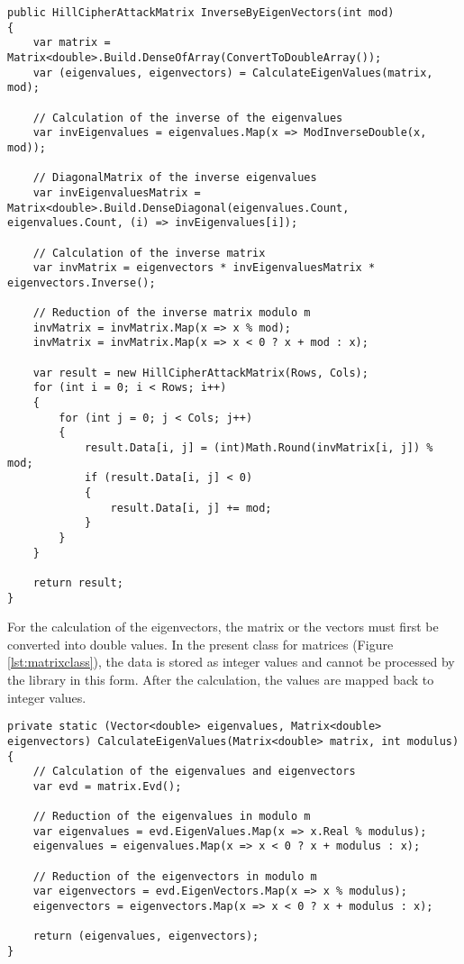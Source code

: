 \documentclass[conference]{IEEEtran}
\begin{document}
\begin{lstlisting}[caption={InverseByEigenVectors method}, label={lst:calcInverseEigenVec}]
public HillCipherAttackMatrix InverseByEigenVectors(int mod)
{
    var matrix = Matrix<double>.Build.DenseOfArray(ConvertToDoubleArray());
    var (eigenvalues, eigenvectors) = CalculateEigenValues(matrix, mod);

    // Calculation of the inverse of the eigenvalues
    var invEigenvalues = eigenvalues.Map(x => ModInverseDouble(x, mod));

    // DiagonalMatrix of the inverse eigenvalues
    var invEigenvaluesMatrix = Matrix<double>.Build.DenseDiagonal(eigenvalues.Count, eigenvalues.Count, (i) => invEigenvalues[i]);

    // Calculation of the inverse matrix
    var invMatrix = eigenvectors * invEigenvaluesMatrix * eigenvectors.Inverse();

    // Reduction of the inverse matrix modulo m
    invMatrix = invMatrix.Map(x => x % mod);
    invMatrix = invMatrix.Map(x => x < 0 ? x + mod : x);

    var result = new HillCipherAttackMatrix(Rows, Cols);
    for (int i = 0; i < Rows; i++)
    {
        for (int j = 0; j < Cols; j++)
        {
            result.Data[i, j] = (int)Math.Round(invMatrix[i, j]) % mod;
            if (result.Data[i, j] < 0)
            {
                result.Data[i, j] += mod;
            }
        }
    }

    return result;
}
\end{lstlisting}

For the calculation of the eigenvectors, the matrix or the vectors must first be converted into double values. In the present class for matrices (Figure \ref{lst:matrixclass}), the data is stored as integer values and cannot be processed by the library in this form. After the calculation, the values are mapped back to integer values.\\

\begin{lstlisting}[caption={CalculateEigenValues method}, label={lst:calcEigenVal}]
private static (Vector<double> eigenvalues, Matrix<double> eigenvectors) CalculateEigenValues(Matrix<double> matrix, int modulus)
{
    // Calculation of the eigenvalues and eigenvectors
    var evd = matrix.Evd();

    // Reduction of the eigenvalues in modulo m
    var eigenvalues = evd.EigenValues.Map(x => x.Real % modulus);
    eigenvalues = eigenvalues.Map(x => x < 0 ? x + modulus : x);

    // Reduction of the eigenvectors in modulo m
    var eigenvectors = evd.EigenVectors.Map(x => x % modulus);
    eigenvectors = eigenvectors.Map(x => x < 0 ? x + modulus : x);

    return (eigenvalues, eigenvectors);
}
\end{lstlisting}
\end{document}
